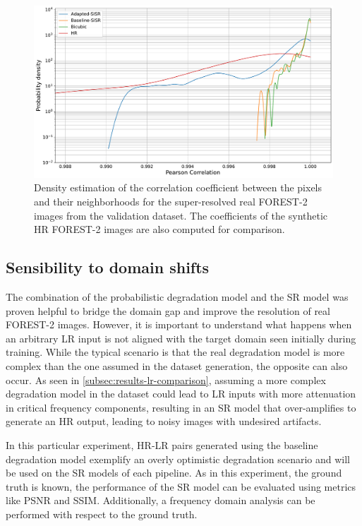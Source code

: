         \begin{figure}[H]
            \centering
            \includegraphics[scale=0.35]{Includes/5-correlation-histogram-validation-dataset.pdf}
            \caption{Density estimation of the correlation coefficient between the pixels and their neighborhoods for the super-resolved real FOREST-2 images from the validation dataset. The coefficients of the synthetic HR FOREST-2 images are also computed for comparison.}
            \label{fig:5-correlation-histogram-validation-dataset}
        \end{figure}

    \subsection{Sensibility to domain shifts}
    
        The combination of the probabilistic degradation model and the SR model was proven helpful to bridge the domain gap and improve the resolution of real FOREST-2 images.
        However, it is important to understand what happens when an arbitrary LR input is not aligned with the target domain seen initially during training.
        While the typical scenario is that the real degradation model is more complex than the one assumed in the dataset generation, the opposite can also occur.
        As seen in \ref{subsec:results-lr-comparison}, assuming a more complex degradation model in the dataset could lead to LR inputs with more attenuation in critical frequency components, resulting in an SR model that over-amplifies to generate an HR output, leading to noisy images with undesired artifacts.
        
        In this particular experiment, HR-LR pairs generated using the baseline degradation model exemplify an overly optimistic degradation scenario and will be used on the SR models of each pipeline.
        As in this experiment, the ground truth is known, the performance of the SR model can be evaluated using metrics like PSNR and SSIM. Additionally, a frequency domain analysis can be performed with respect to the ground truth.
        
